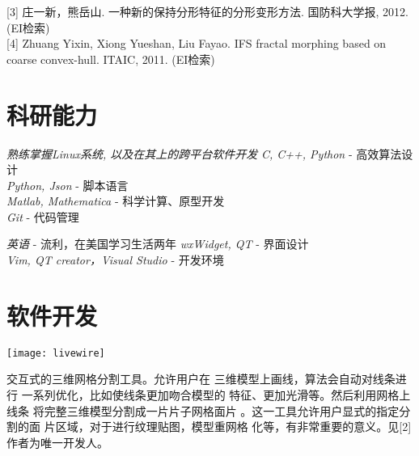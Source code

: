 \documentclass[20pt]{article} %
\begin{document}
[3]   庄一新，熊岳山. 一种新的保持分形特征的分形变形方法. 国防科大学报, 2012. (EI检索)\\


[4]   Zhuang Yixin, Xiong Yueshan, Liu Fayao. IFS fractal morphing based on coarse convex-hull. ITAIC, 2011. (EI检索)

%
%
%

\section{科研能力}

\begin{minipage}{0.5\textwidth}
\centering
{}
{
\textit{熟练掌握Linux系统, 以及在其上的跨平台软件开发}
}
{
\textit{C, C++, Python} - 高效算法设计\\
\textit{Python, Json} - 脚本语言\\
\textit{Matlab, Mathematica} - 科学计算、原型开发\\
\textit{Git} - 代码管理
}
\end{minipage}
\begin{minipage}{0.5\textwidth}
{
\textit{英语} -   流利，在美国学习生活两年
}
{
\textit{wxWidget, QT} - 界面设计\\
\textit{Vim, QT creator，Visual Studio} - 开发环境
}
\end{minipage}

\section{软件开发}

\begin{minipage}{0.5\textwidth}
{
\center
  \texttt{[image: livewire]}
}
\end{minipage}
\begin{minipage}{0.5\textwidth}
交互式的三维网格分割工具。允许用户在
三维模型上画线，算法会自动对线条进行
一系列优化，比如使线条更加吻合模型的
特征、更加光滑等。然后利用网格上线条
将完整三维模型分割成一片片子网格面片
。这一工具允许用户显式的指定分割的面
片区域，对于进行纹理贴图，模型重网格
化等，有非常重要的意义。见[2]\\%
作者为唯一开发人。
\end{minipage}
\end{document}
